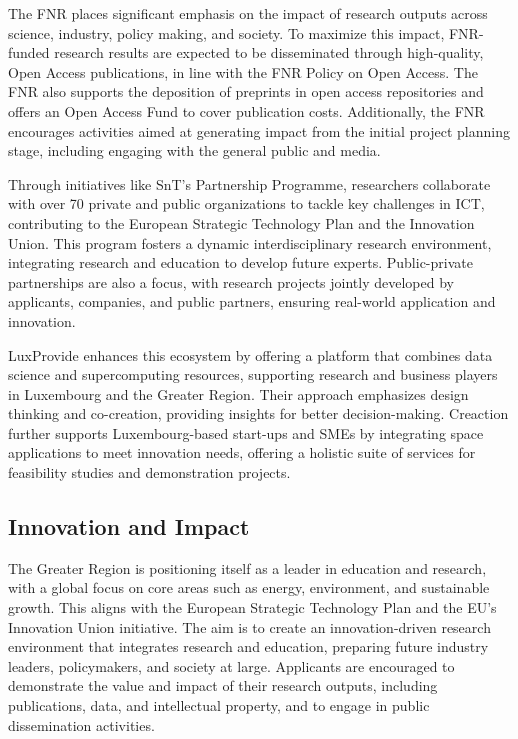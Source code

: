 \documentclass{article}
\begin{document}
The FNR places significant emphasis on the impact of research outputs across science, industry, policy making, and society. To maximize this impact, FNR-funded research results are expected to be disseminated through high-quality, Open Access publications, in line with the FNR Policy on Open Access. The FNR also supports the deposition of preprints in open access repositories and offers an Open Access Fund to cover publication costs. Additionally, the FNR encourages activities aimed at generating impact from the initial project planning stage, including engaging with the general public and media.

Through initiatives like SnT’s Partnership Programme, researchers collaborate with over 70 private and public organizations to tackle key challenges in ICT, contributing to the European Strategic Technology Plan and the Innovation Union. This program fosters a dynamic interdisciplinary research environment, integrating research and education to develop future experts. Public-private partnerships are also a focus, with research projects jointly developed by applicants, companies, and public partners, ensuring real-world application and innovation.

LuxProvide enhances this ecosystem by offering a platform that combines data science and supercomputing resources, supporting research and business players in Luxembourg and the Greater Region. Their approach emphasizes design thinking and co-creation, providing insights for better decision-making. Creaction further supports Luxembourg-based start-ups and SMEs by integrating space applications to meet innovation needs, offering a holistic suite of services for feasibility studies and demonstration projects.

\subsection{Innovation and Impact}

The Greater Region is positioning itself as a leader in education and research, with a global focus on core areas such as energy, environment, and sustainable growth. This aligns with the European Strategic Technology Plan and the EU's Innovation Union initiative. The aim is to create an innovation-driven research environment that integrates research and education, preparing future industry leaders, policymakers, and society at large. Applicants are encouraged to demonstrate the value and impact of their research outputs, including publications, data, and intellectual property, and to engage in public dissemination activities.
\end{document}
